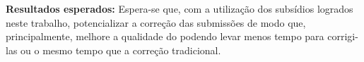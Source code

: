 \documentclass[12pt,english,brazil,a4paper,utf8,oneside]{utfpr-tcc}
\begin{document}
\begin{resumo}
\textbf{Resultados esperados:} Espera-se que, com a utilização dos subsídios logrados
neste trabalho, potencializar a correção das submissões de modo que, principalmente,
melhore a qualidade do  podendo levar menos tempo para corrigi-las
ou o mesmo tempo que a correção tradicional.


\end{resumo}







\listoffigures
\listoftables
{}

\tableofcontents

\mainmatter







\backmatter
\appendix

\end{document}
